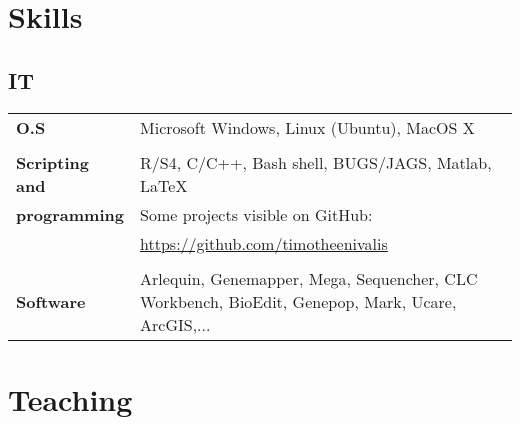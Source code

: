 \documentclass[a4paper,oneside,10pt]{article} %
\begin{document}
\section*{Skills}

\subsection*{IT}

\begin{tabular}{p{4cm}|p{11cm}}
\hfill \textbf{O.S} & Microsoft Windows, Linux (Ubuntu), MacOS X\\
\multicolumn{2}{c}{} \\
\hfill \textbf{Scripting and} & R/S4, C/C++, Bash shell, BUGS/JAGS, Matlab, \LaTeX\\
\hfill \textbf{programming} & Some projects visible on GitHub: \\
										& \url{https://github.com/timotheenivalis}\\
\multicolumn{2}{c}{} \\
\hfill \textbf{Software} & Arlequin, Genemapper, Mega, Sequencher, CLC Workbench, BioEdit, Genepop, Mark, Ucare, ArcGIS,...\\
\end{tabular}

\section*{Teaching}
\end{document}
